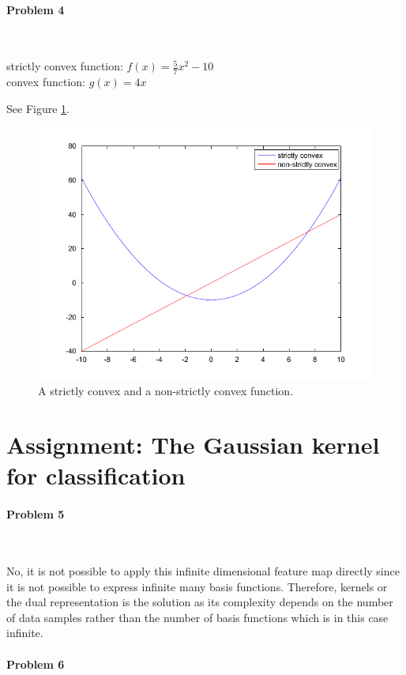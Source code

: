 \documentclass{article}
\begin{document}
\paragraph*{Problem 4}
$\;$ 

strictly convex function: $f(x) = \frac{5}{7}x^2-10$\\
convex function: $g(x) = 4x$

See Figure \ref{convex}.

\begin{figure}[ht]
\centering
\includegraphics{convex.pdf}
\caption{A strictly convex and a non-strictly convex function.}
\label{convex}
\end{figure}


\section{Assignment: The Gaussian kernel for classification}
\paragraph*{Problem 5}
$\;$

No, it is not possible to apply this infinite dimensional feature map directly since it is not possible to express infinite many basis functions. Therefore, kernels or the dual representation is the solution as its complexity depends on the number of data samples rather than the number of basis functions which is in this case infinite.

\paragraph*{Problem 6}
$\;$ 
\end{document}
